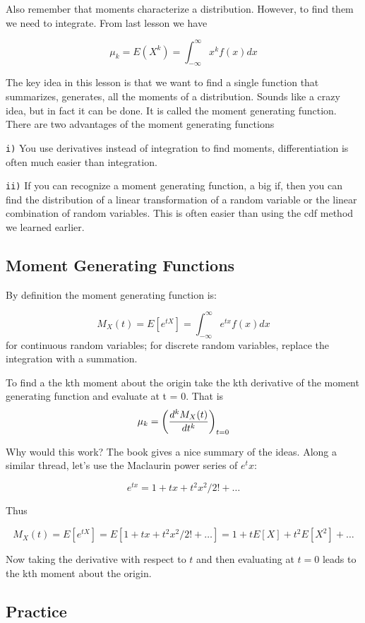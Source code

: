 \documentclass[]{book}
\theoremstyle{definition}
\theoremstyle{definition}
\theoremstyle{definition}
\theoremstyle{remark}
\begin{document}
Also remember that moments characterize a distribution. However, to find
them we need to integrate. From last lesson we have

\[\mu_{k}=E(X^k)=\int_{-\infty}^{\infty}x^k f(x)dx\]

The key idea in this lesson is that we want to find a single function
that summarizes, generates, all the moments of a distribution. Sounds
like a crazy idea, but in fact it can be done. It is called the moment
generating function. There are two advantages of the moment generating
functions

\texttt{i)} You use derivatives instead of integration to find moments,
differentiation is often much easier than integration.

\texttt{ii)} If you can recognize a moment generating function, a big
if, then you can find the distribution of a linear transformation of a
random variable or the linear combination of random variables. This is
often easier than using the cdf method we learned earlier.

\subsection{Moment Generating
Functions}\label{moment-generating-functions}

By definition the moment generating function is:

\[M_{X}(t)=E[e^{tX}] = \int_{-\infty}^{\infty}e^{tx}f(x)dx\] for
continuous random variables; for discrete random variables, replace the
integration with a summation.

To find a the kth moment about the origin take the kth derivative of the
moment generating function and evaluate at t = 0. That is
\[\mu_{k}=\left(  {d^{k}M_{X}(t) \over dt^{k}} \right) _{t=0}\]

Why would this work? The book gives a nice summary of the ideas. Along a
similar thread, let's use the Maclaurin power series of \(e^tx\):

\[e^{tx}=1+tx+t^{2}x^{2}/2! + \dots \]

Thus

\[M_{X}(t)=E[e^{tX}]=E[1+tx+t^{2}x^{2}/2! + \dots]=1+tE[X]+t^{2}E[X^{2}]+\dots\]

Now taking the derivative with respect to \(t\) and then evaluating at
\(t=0\) leads to the kth moment about the origin.

\subsection{Practice}\label{practice-2}
\end{document}
